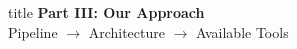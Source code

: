 \documentclass[aspectratio=169,xcolor=dvipsnames]{beamer}
\begin{document}
\begin{frame}[plain]
    \centering
    \vfill
    \begin{beamercolorbox}[center,shadow=true,rounded=true]{title}
        \textbf{Part III: Our Approach}\\
        \vspace{0.5em}
        \large Pipeline $\to$ Architecture $\to$ Available Tools
    \end{beamercolorbox}
    \vfill
\end{frame}

\end{document}
